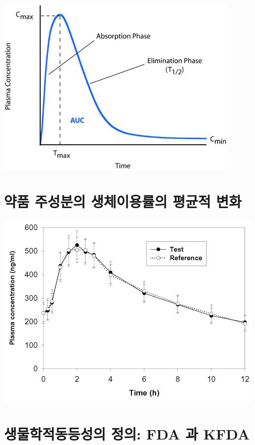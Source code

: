 \documentclass[
]{book}
\begin{document}
\includegraphics{plasma.jpg}

\hypertarget{uxc57duxd488-uxc8fcuxc131uxbd84uxc758-uxc0dduxccb4uxc774uxc6a9uxb960uxc758-uxd3c9uxade0uxc801-uxbcc0uxd654}{%
\section{약품 주성분의 생체이용률의 평균적 변화}\label{uxc57duxd488-uxc8fcuxc131uxbd84uxc758-uxc0dduxccb4uxc774uxc6a9uxb960uxc758-uxd3c9uxade0uxc801-uxbcc0uxd654}}

\includegraphics{bioequi.jpg}

\hypertarget{uxc0dduxbb3cuxd559uxc801uxb3d9uxb4f1uxc131uxc758-uxc815uxc758-fda-uxacfc-kfda}{%
\section{생물학적동등성의 정의: FDA 과 KFDA}\label{uxc0dduxbb3cuxd559uxc801uxb3d9uxb4f1uxc131uxc758-uxc815uxc758-fda-uxacfc-kfda}}
\end{document}
